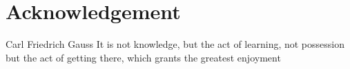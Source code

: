 \chapter*{Acknowledgement}
\begin{chapquote}{Carl Friedrich Gauss}
It is not knowledge, but the act of learning, not possession but the act of getting there, which grants the greatest enjoyment
\end{chapquote}

\lipsum[1-4]
